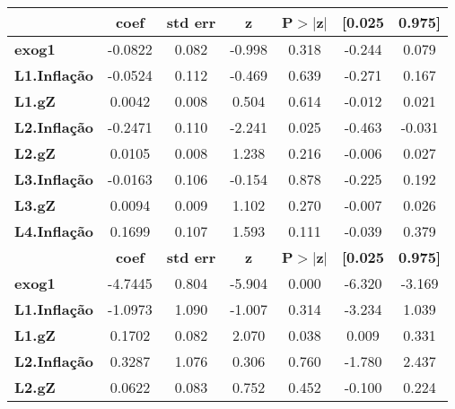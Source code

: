 \begin{center}
\begin{tabular}{lcccccc}
\toprule
                     & \textbf{coef} & \textbf{std err} & \textbf{z} & \textbf{P$> |$z$|$} & \textbf{[0.025} & \textbf{0.975]}  \\
\midrule
\textbf{exog1}       &      -0.0822  &        0.082     &    -0.998  &         0.318        &       -0.244    &        0.079     \\
\textbf{L1.Inflação} &      -0.0524  &        0.112     &    -0.469  &         0.639        &       -0.271    &        0.167     \\
\textbf{L1.gZ}       &       0.0042  &        0.008     &     0.504  &         0.614        &       -0.012    &        0.021     \\
\textbf{L2.Inflação} &      -0.2471  &        0.110     &    -2.241  &         0.025        &       -0.463    &       -0.031     \\
\textbf{L2.gZ}       &       0.0105  &        0.008     &     1.238  &         0.216        &       -0.006    &        0.027     \\
\textbf{L3.Inflação} &      -0.0163  &        0.106     &    -0.154  &         0.878        &       -0.225    &        0.192     \\
\textbf{L3.gZ}       &       0.0094  &        0.009     &     1.102  &         0.270        &       -0.007    &        0.026     \\
\textbf{L4.Inflação} &       0.1699  &        0.107     &     1.593  &         0.111        &       -0.039    &        0.379     \\
                     & \textbf{coef} & \textbf{std err} & \textbf{z} & \textbf{P$> |$z$|$} & \textbf{[0.025} & \textbf{0.975]}  \\
\midrule
\textbf{exog1}       &      -4.7445  &        0.804     &    -5.904  &         0.000        &       -6.320    &       -3.169     \\
\textbf{L1.Inflação} &      -1.0973  &        1.090     &    -1.007  &         0.314        &       -3.234    &        1.039     \\
\textbf{L1.gZ}       &       0.1702  &        0.082     &     2.070  &         0.038        &        0.009    &        0.331     \\
\textbf{L2.Inflação} &       0.3287  &        1.076     &     0.306  &         0.760        &       -1.780    &        2.437     \\
\textbf{L2.gZ}       &       0.0622  &        0.083     &     0.752  &         0.452        &       -0.100    &        0.224     \\

\end{tabular}
\end{center}
